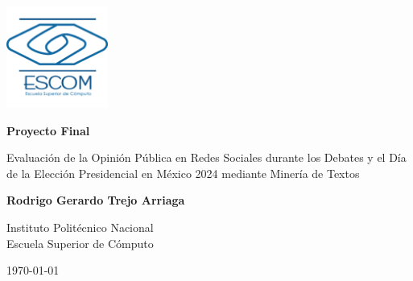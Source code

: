 \documentclass[10pt, a4paper]{article}
\title{\mytitle}
\author{\myauthor\hspace{1em}\\\contact\\Instituto Politécnico Nacional -- ESCOM\hspace{0.5em}\\\hspace{0.5em}\mymodule}
\date{}
\begin{document}
	\begin{titlepage}
		\centering
		\includegraphics[width=0.25\textwidth]{logo.png}\par\vspace{2.5cm} %
		{\huge \textbf{Proyecto Final}}\par\vspace{2cm}
		{\LARGE Evaluación de la Opinión Pública en Redes Sociales durante los Debates y el Día de la Elección Presidencial en México 2024 mediante Minería de Textos \\}\par\vspace{2cm}
		{\large \textbf{Rodrigo Gerardo Trejo Arriaga}}\par\vspace{0.2cm}
		{\large \textbf{}}\par\vspace{0.2cm}
		{\large \textbf{}}\par\vspace{0.5cm}
		{\large Instituto Politécnico Nacional\\ Escuela Superior de Cómputo}\par\vspace{1cm}
		{\large \textbf{}}\par\vspace{2cm}
		{\large \today}\par
	\end{titlepage}
	
	\newpage
	\thispagestyle{fancy}
	\tableofcontents
	\newpage
	\thispagestyle{fancy}
	\listoffigures
	\newpage
	\thispagestyle{fancy}
	\listoftables
	\newpage
	
	
	
\end{document}

